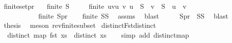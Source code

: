 \begin{isabellebody}
\endisatagproof
{\isafoldproof}%
%
\isadelimproof
\isanewline
%
\endisadelimproof
\isanewline
{}\isamarkupfalse%
\ finite{\isacharunderscore}{\kern0pt}set{\isacharunderscore}{\kern0pt}pr{\isacharcolon}{\kern0pt}\isanewline
\ \ \ {\isachardoublequoteopen}finite\ S{\isachardoublequoteclose}\isanewline
\ \ \ \ \ {\isachardoublequoteopen}finite\ {\isacharbraceleft}{\kern0pt}{\isacharparenleft}{\kern0pt}u{\isacharcomma}{\kern0pt}v{\isacharparenright}{\kern0pt}{\isacharbar}{\kern0pt}u\ v{\isachardot}{\kern0pt}\ u\ {\isasymin}\ S\ {\isasymand}\ v\ {\isasymin}\ S\ {\isasymand}\ u\ {\isacharless}{\kern0pt}\ v{\isacharbraceright}{\kern0pt}{\isachardoublequoteclose}\isanewline
\ \ \ \ \ \ \ \ \ \ {\isacharparenleft}{\kern0pt}\ {\isachardoublequoteopen}finite\ {\isacharquery}{\kern0pt}Spr{\isachardoublequoteclose}{\isacharparenright}{\kern0pt}\isanewline
%
\isadelimproof
%
\endisadelimproof
%
\isatagproof
{}\isamarkupfalse%
{\isacharminus}{\kern0pt}\isanewline
\ \ \isamarkupfalse%
\ {\isachardoublequoteopen}finite\ {\isacharparenleft}{\kern0pt}S{\isasymtimes}S{\isacharparenright}{\kern0pt}{\isachardoublequoteclose}\ \isamarkupfalse%
\ assms\ \isamarkupfalse%
\ blast\isanewline
\ \ \isamarkupfalse%
\ \isamarkupfalse%
\ {\isachardoublequoteopen}{\isacharquery}{\kern0pt}Spr\ {\isasymsubseteq}\ S{\isasymtimes}S{\isachardoublequoteclose}\ \isamarkupfalse%
\ blast\isanewline
\ \ \isamarkupfalse%
\ \isamarkupfalse%
\ {\isacharquery}{\kern0pt}thesis\ \isamarkupfalse%
\ {\isacharparenleft}{\kern0pt}meson\ rev{\isacharunderscore}{\kern0pt}finite{\isacharunderscore}{\kern0pt}subset{\isacharparenright}{\kern0pt}\isanewline
{}\isamarkupfalse%
%
\endisatagproof
{\isafoldproof}%
%
\isadelimproof
\isanewline
%
\endisadelimproof
\isanewline
\isanewline
\isanewline
\isanewline
{}\isamarkupfalse%
\ distinctFst{\isacharunderscore}{\kern0pt}distinct{\isacharcolon}{\kern0pt}\isanewline
\ \ {\isachardoublequoteopen}distinct\ {\isacharparenleft}{\kern0pt}map\ fst\ xs{\isacharparenright}{\kern0pt}\ {\isasymlongrightarrow}\ distinct\ xs{\isachardoublequoteclose}\isanewline
%
\isadelimproof
\ \ %
\endisadelimproof
%
\isatagproof
{}\isamarkupfalse%
\ {\isacharparenleft}{\kern0pt}simp\ add{\isacharcolon}{\kern0pt}\ distinct{\isacharunderscore}{\kern0pt}map{\isacharparenright}{\kern0pt}%

\end{isabellebody}
